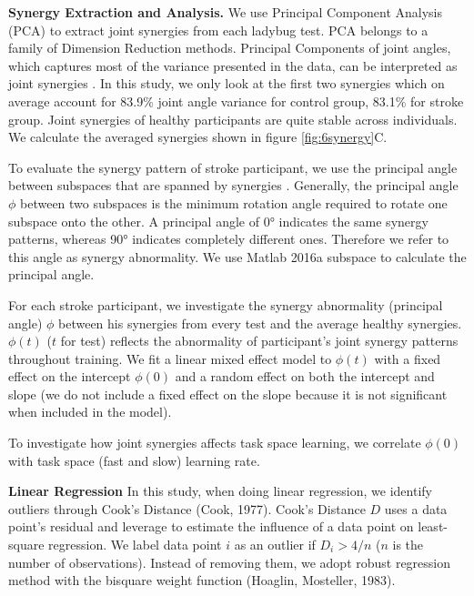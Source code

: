\textbf{Synergy Extraction and Analysis.}
We use Principal Component Analysis (PCA) to extract joint synergies from each ladybug test.
PCA belongs to a family of Dimension Reduction methods.
Principal Components of joint angles, which captures most of the variance presented in the data, can be interpreted as joint synergies \cite{}.
In this study, we only look at the first two synergies which on average account for 83.9\% joint angle variance for control group, 83.1\% for stroke group.
Joint synergies of healthy participants are quite stable across individuals.
We calculate the averaged synergies shown in figure \ref{fig:6synergy}C.

To evaluate the synergy pattern of stroke participant, we use the principal angle \cite{} between subspaces that are spanned by synergies \cite{}.
Generally, the principal angle $ \phi $ between two subspaces is the minimum rotation angle required to rotate one subspace onto the other.
A principal angle of \ang{0} indicates the same synergy patterns, whereas \ang{90} indicates completely different ones.
Therefore we refer to this angle as synergy abnormality.
We use Matlab 2016a \textsf{subspace} \cite{} to calculate the principal angle. 

For each stroke participant, we investigate the synergy abnormality (principal angle) $ \phi $ between his synergies from every test and the average healthy synergies.
$ \phi(t) $ ($ t $ for test) reflects the abnormality of participant's joint synergy patterns throughout training. 
We fit a linear mixed effect model to $ \phi(t) $ with a fixed effect on the intercept $ \phi(0) $ and a random effect on both the intercept and slope (we do not include a fixed effect on the slope because it is not significant when included in the model).

To investigate how joint synergies affects task space learning, we correlate $ \phi(0) $ with task space (fast and slow) learning rate.

\textbf{Linear Regression}
In this study, when doing linear regression, we identify outliers through Cook's Distance (Cook, 1977).
Cook's Distance $ D $ uses a data point's residual and leverage \cite{Chatterjee1986} to estimate the influence of a data point on least-square regression.
We label data point $ i $ as an outlier if $ D_i > 4/n $ ($ n $ is the number of observations)\cite{Bollen1985}.
Instead of removing them, we adopt robust regression method with the bisquare weight function (Hoaglin, Mosteller, 1983).

